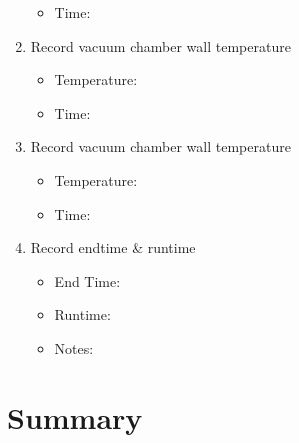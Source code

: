 \documentclass[11pt]{article}
\begin{document}
\begin{enumerate}
\begin{itemize}
                \item Time: 
            \end{itemize}
            \item Record vacuum chamber wall temperature
            \begin{itemize}
                \item Temperature: 
                \item Time: 
            \end{itemize}
            \item Record vacuum chamber wall temperature
            \begin{itemize}
                \item Temperature: 
                \item Time: 
            \end{itemize}
            \item Record endtime \& runtime
            \begin{itemize}
                \item End Time: 
                \item Runtime: 
                \item Notes: 
            \end{itemize}
        \end{enumerate}

    \newpage

    \section{Summary}

    \appendix
\end{document}
